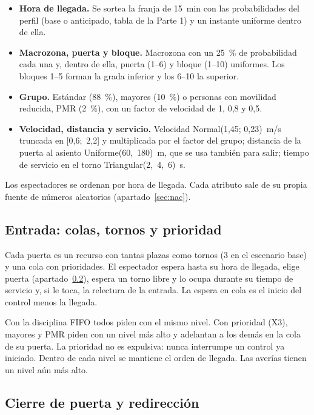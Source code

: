 \begin{itemize}
  \item \textbf{Hora de llegada.} Se sortea la franja de 15~min con las
    probabilidades del perfil (base o anticipado, tabla de la Parte 1) y un
    instante uniforme dentro de ella.
  \item \textbf{Macrozona, puerta y bloque.} Macrozona con un 25~\% de
    probabilidad cada una y, dentro de ella, puerta (1--6) y bloque (1--10)
    uniformes. Los bloques 1--5 forman la grada inferior y los 6--10 la
    superior.
  \item \textbf{Grupo.} Estándar (88~\%), mayores (10~\%) o personas con
    movilidad reducida, PMR (2~\%), con un factor de velocidad de 1, 0,8 y 0,5.
  \item \textbf{Velocidad, distancia y servicio.} Velocidad Normal(1,45;
    0,23)~m/s truncada en [0,6;~2,2] y multiplicada por el factor del grupo;
    distancia de la puerta al asiento Uniforme(60,~180)~m, que se usa también
    para salir; tiempo de servicio en el torno Triangular(2,~4,~6)~s.
\end{itemize}

Los espectadores se ordenan por hora de llegada. Cada atributo sale de su
propia fuente de números aleatorios (apartado~\ref{sec:nac}).

\subsection{Entrada: colas, tornos y prioridad}

Cada puerta es un recurso con tantas plazas como tornos (3 en el escenario
base) y una cola con prioridades. El espectador espera hasta su hora de
llegada, elige puerta (apartado~\ref{sec:cierre}), espera un torno libre y lo
ocupa durante su tiempo de servicio y, si le toca, la relectura de la entrada.
La espera en cola es el inicio del control menos la llegada.

Con la disciplina FIFO todos piden con el mismo nivel. Con prioridad (X3),
mayores y PMR piden con un nivel más alto y adelantan a los demás en la cola de
su puerta. La prioridad no es expulsiva: nunca interrumpe un control ya
iniciado. Dentro de cada nivel se mantiene el orden de llegada. Las averías
tienen un nivel aún más alto.

\subsection{Cierre de puerta y redirección}\label{sec:cierre}


